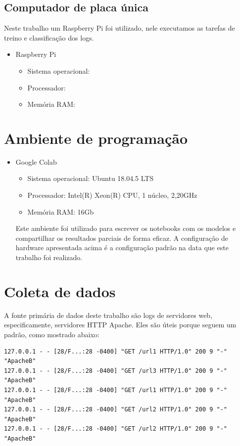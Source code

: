 \subsection{Computador de placa única}

Neste trabalho um Raspberry Pi foi utilizado, nele executamos as tarefas de treino e classificação
dos logs.

\begin{itemize}
    \item Raspberry Pi
        \begin{itemize}
            \item Sistema operacional: 
            \item Processador: 
            \item Memória RAM: 
        \end{itemize}
\end{itemize}

\section{Ambiente de programação}
\begin{itemize}
    \item Google Colab
        \begin{itemize}
            \item Sistema operacional: Ubuntu 18.04.5 LTS
            \item Processador: Intel(R) Xeon(R) CPU, 1 núcleo, 2,20GHz
            \item Memória RAM: 16Gb
        \end{itemize} 
        Este ambiente foi utilizado para escrever os notebooks com os modelos e compartilhar os resultados
        parciais de forma eficaz. A configuração de hardware apresentada acima é a configuração padrão na data 
        que este trabalho foi realizado.
\end{itemize}

\section{Coleta de dados}

A fonte primária de dados deste trabalho são logs de servidores web, especificamente,
servidores HTTP Apache. Eles são úteis porque seguem um padrão, como mostrado abaixo:

\begin{verbatim}
127.0.0.1 - - [28/F...:28 -0400] "GET /url1 HTTP/1.0" 200 9 "-" "ApacheB"
127.0.0.1 - - [28/F...:28 -0400] "GET /url3 HTTP/1.0" 200 9 "-" "ApacheB"
127.0.0.1 - - [28/F...:28 -0400] "GET /url1 HTTP/1.0" 200 9 "-" "ApacheB"
127.0.0.1 - - [28/F...:28 -0400] "GET /url2 HTTP/1.0" 200 9 "-" "ApacheB"
127.0.0.1 - - [28/F...:28 -0400] "GET /url2 HTTP/1.0" 200 9 "-" "ApacheB"
\end{verbatim}

